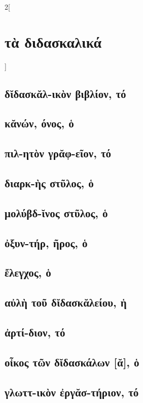 \documentclass{book}
\begin{document}
\begin{multicols}{2}[\section{τὰ διδασκαλικά}]
\subsection{δῐδασκᾰλ-ικὸν βιβλίον, τό}
\subsection{κᾰνών, όνος, ὁ}
\subsection{πιλ-ητὸν γρᾰφ-εῖον, τό}
\subsection{διαρκ-ὴς στῦλος, ὁ}
\subsection{μολύβδ-ῐνος στῦλος, ὁ}
\subsection{ὀξυν-τήρ, ῆρος, ὁ}
\subsection{ἔλεγχος, ὁ}
\subsection{αὐλὴ τοῦ δῐδασκᾰλείου, ἡ}
\subsection{ἀρτί-διον, τό}
\subsection{οἶκος τῶν δῐδασκάλων [ᾰ], ὁ}
\subsection{γλωττ-ικὸν ἐργᾰσ-τήριον, τό}
~
\end{multicols}
\newpage
\end{document}
